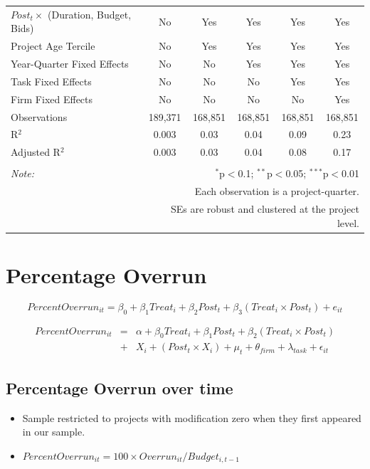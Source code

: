 \documentclass[
]{article}
\providecommand{\tightlist}{%
  \setlength{\itemsep}{0pt}\setlength{\parskip}{0pt}}
\begin{document}
\begin{table}[H]
\begin{tabular}{@{\extracolsep{-2pt}}lccccc}
$Post_t \times$  (Duration, Budget, Bids) & No & Yes & Yes & Yes & Yes \\ 
Project Age Tercile & No & Yes & Yes & Yes & Yes \\ 
Year-Quarter Fixed Effects & No & No & Yes & Yes & Yes \\ 
Task Fixed Effects & No & No & No & Yes & Yes \\ 
Firm Fixed Effects & No & No & No & No & Yes \\ 
Observations & 189,371 & 168,851 & 168,851 & 168,851 & 168,851 \\ 
R$^{2}$ & 0.003 & 0.03 & 0.04 & 0.09 & 0.23 \\ 
Adjusted R$^{2}$ & 0.003 & 0.03 & 0.04 & 0.08 & 0.17 \\ 
\hline 
\hline \\[-1.8ex] 
\textit{Note:}  & \multicolumn{5}{r}{$^{*}$p$<$0.1; $^{**}$p$<$0.05; $^{***}$p$<$0.01} \\ 
 & \multicolumn{5}{r}{Each observation is a project-quarter.} \\ 
 & \multicolumn{5}{r}{SEs are robust and clustered at the project level.} \\ 
\end{tabular} 
\end{table}

\hypertarget{percentage-overrun}{%
\section{Percentage Overrun}\label{percentage-overrun}}

\[ PercentOverrun_{it} = \beta_0 + \beta_1 Treat_i + \beta_2 Post_t + \beta_3 (Treat_i \times Post_t) + e_{it}\]

\[ \begin{aligned} PercentOverrun_{it} &=& \alpha+\beta_0 Treat_i + \beta_1 Post_t + \beta_2 (Treat_i \times Post_t)\\
&+&  X_i + (Post_t \times X_i) + \mu_t + \theta_{firm} + \lambda_{task}+ \epsilon_{it}
\end{aligned}\]

\hypertarget{percentage-overrun-over-time}{%
\subsection{Percentage Overrun over
time}\label{percentage-overrun-over-time}}

\begin{itemize}
\tightlist
\item
  Sample restricted to projects with modification zero when they first
  appeared in our sample.
\item
  \(PercentOverrun_{it}=100 \times Overrun_{it}/Budget_{i,t-1}\)
\end{itemize}
\end{document}
